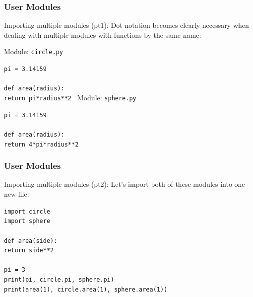 \documentclass{beamer}
\newcommand{\code}[1]{\texttt{#1}}
\newcommand{\tab}{\hspace*{22pt}}
\begin{document}
\begin{frame}	
	\frametitle{User Modules}
	
	\begin{block}{Importing multiple modules (pt1):}
		Dot notation becomes clearly necessary when dealing with multiple modules with functions by the same name:
		
		\vspace{10pt}
			Module: \code{circle.py}
			
			\vspace{10pt}
			\code{pi = 3.14159 \\
			\tab \\
			def area(radius): \\
				\tab return pi*radius**2
			}
		\endminipage\hfill
			Module: \code{sphere.py}
			
			\vspace{10pt}
			\code{pi = 3.14159 \\
			\tab \\
			def area(radius): \\
				\tab return 4*pi*radius**2
			}
		\endminipage\hfill
	\end{block}
	
\end{frame}

\begin{frame}	
	\frametitle{User Modules}
	
	\begin{block}{Importing multiple modules (pt2):}
		Let's import both of these modules into one new file:
		
		\vspace{10pt}
		
		\code{import circle \\
				import sphere \\
				\tab \\
				def area(side): \\
					\tab return side**2 \\
				\tab \\
				pi = 3 \\
				print(pi, circle.pi, sphere.pi) \\
				print(area(1), circle.area(1), sphere.area(1)) \\
		}
	\end{block}
	
\end{frame}
\end{document}
